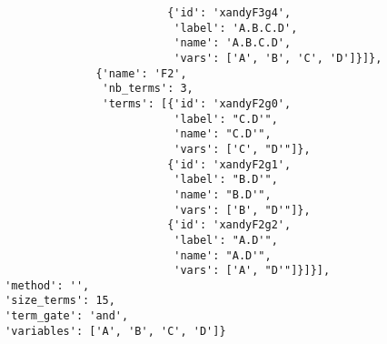 \begin{verbatim}
                          {'id': 'xandyF3g4',
                           'label': 'A.B.C.D',
                           'name': 'A.B.C.D',
                           'vars': ['A', 'B', 'C', 'D']}]},
               {'name': 'F2',
                'nb_terms': 3,
                'terms': [{'id': 'xandyF2g0',
                           'label': "C.D'",
                           'name': "C.D'",
                           'vars': ['C', "D'"]},
                          {'id': 'xandyF2g1',
                           'label': "B.D'",
                           'name': "B.D'",
                           'vars': ['B', "D'"]},
                          {'id': 'xandyF2g2',
                           'label': "A.D'",
                           'name': "A.D'",
                           'vars': ['A', "D'"]}]}],
 'method': '',
 'size_terms': 15,
 'term_gate': 'and',
 'variables': ['A', 'B', 'C', 'D']}
\end{verbatim}





